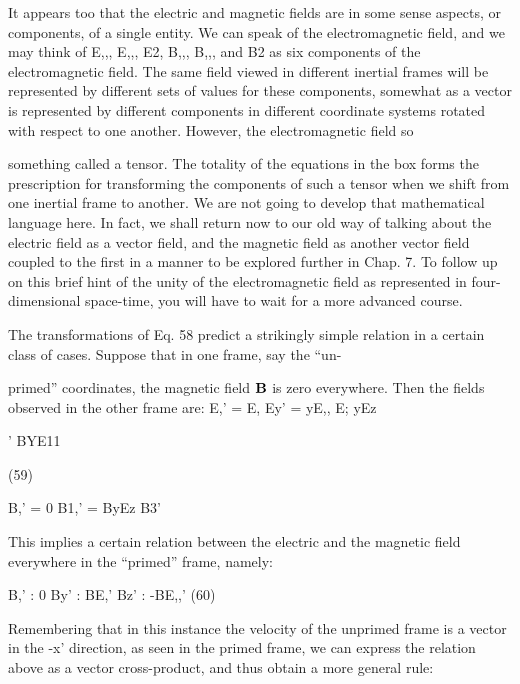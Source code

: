 It appears too that the electric and magnetic fields are in some
sense aspects, or components, of a single entity. We can speak of the
electromagnetic field, and we may think of E,,, E,,, E2, B,,, B,,, and B2 as
six components of the electromagnetic field. The same field viewed
in different inertial frames will be represented by different sets of
values for these components, somewhat as a vector is represented by
different components in different coordinate systems rotated with
respect to one another. However, the electromagnetic field so

something called a tensor. The totality of the equations in the box
forms the prescription for transforming the components of such a
tensor when we shift from one inertial frame to another. We are not
going to develop that mathematical language here. In fact, we shall
return now to our old way of talking about the electric field as a vector
field, and the magnetic field as another vector field coupled to the
first in a manner to be explored further in Chap. 7. To follow up on
this brief hint of the unity of the electromagnetic field as represented
in four-dimensional space-time, you will have to wait for a more
advanced course.

The transformations of Eq. 58 predict a strikingly simple relation
in a certain class of cases. Suppose that in one frame, say the ``un-

primed'' coordinates, the magnetic field $\mathbf{B}$ is zero everywhere. Then
the fields observed in the other frame are:
E,' = E, Ey' = yE,, E; yEz

\begin{equation}
\end{equation}
' BYE11

(59)

B,' = 0 B1,' = ByEz B3'

This implies a certain relation between the electric and the magnetic
field everywhere in the ``primed'' frame, namely:

\begin{equation}
\end{equation}
B,' : 0 By' : BE,' Bz' : -BE,,' (60)

Remembering that in this instance the velocity of the unprimed frame
is a vector in the -x' direction, as seen in the primed frame, we can
express the relation above as a vector cross-product, and thus obtain
a more general rule:

\begin{equation}
\end{equation}
    
